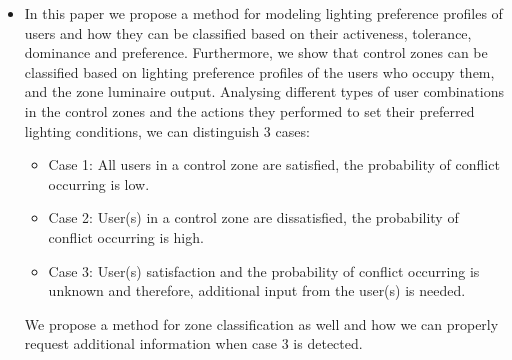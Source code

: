 \documentclass[a4paper]{article}
\begin{document}
\begin{itemize}
\item In this paper we propose a method for modeling lighting preference profiles of users and how they can be classified based on their activeness, tolerance, dominance and preference. Furthermore, we show that control zones can be classified based on lighting preference profiles of the users who occupy them, and the zone luminaire output. Analysing different types of user combinations in the control zones and the actions they performed to set their preferred lighting conditions, we can distinguish 3 cases:
	\begin{itemize}
		\item Case 1: All users in a control zone are satisfied, the probability of conflict occurring is low.
		\item Case 2: User(s) in a control zone are dissatisfied, the probability of conflict occurring is high.
		\item Case 3: User(s) satisfaction and the probability of conflict occurring is unknown and therefore, additional input from the user(s) is needed.
	\end{itemize}
We propose a method for zone classification as well and how we can properly request additional information when case 3 is detected.


\end{itemize}
\end{document}

